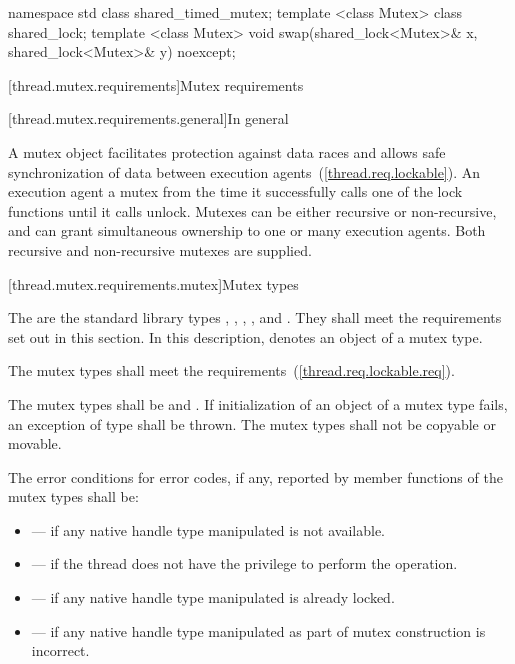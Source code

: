 %

\begin{codeblock}
namespace std {
  class shared_timed_mutex;
  template <class Mutex> class shared_lock;
  template <class Mutex>
    void swap(shared_lock<Mutex>& x, shared_lock<Mutex>& y) noexcept;
}
\end{codeblock}

[thread.mutex.requirements]{Mutex requirements}

[thread.mutex.requirements.general]{In general}

\pnum
A mutex object facilitates protection against data races and allows safe synchronization of
data between execution agents~(\ref{thread.req.lockable}).
An execution agent  a mutex from the time it successfully calls one of the
lock functions until it calls unlock. Mutexes can be either recursive or non-recursive, and can
grant simultaneous ownership to one or many execution agents. Both
recursive and non-recursive mutexes are supplied.

[thread.mutex.requirements.mutex]{Mutex types}

\pnum
The  are the standard library types ,
, , ,
and .
They shall meet the requirements set out in this section. In this description, 
denotes an object of a mutex type.

\pnum
The mutex types shall meet the  requirements~(\ref{thread.req.lockable.req}).

\pnum
The mutex types shall be  and . If
initialization of an object of a mutex type fails, an exception of type
 shall be thrown. The mutex types shall not be copyable or movable.

\pnum
The error conditions for error codes, if any, reported by member functions of the mutex types
shall be:
\begin{itemize}
\item {} --- if any native handle type manipulated is not available.
\item {} --- if the thread does not have the
privilege to perform the operation.
\item {} --- if any native handle type manipulated is already locked.
\item {} --- if any native handle type manipulated as part of mutex
construction is incorrect.
\end{itemize}

